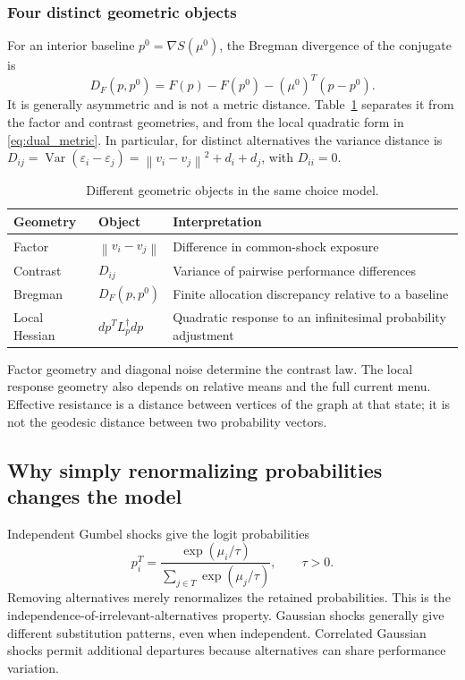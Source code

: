 \documentclass[11pt]{amsart}
\newcommand{\norm}[1]{\left\lVert#1\right\rVert}
\theoremstyle{definition}
\begin{document}
\subsubsection{Four distinct geometric objects}
For an interior baseline $p^0=\nabla S(\mu^0)$, the Bregman divergence of
the conjugate is
\begin{equation}\label{eq:bregman}
 D_F(p,p^0)=F(p)-F(p^0)-(\mu^0)^T(p-p^0).
\end{equation}
It is generally asymmetric and is not a metric distance. Table~\ref{tab:geometries}
separates it from the factor and contrast geometries, and from the local
quadratic form in \eqref{eq:dual_metric}. In particular, for distinct
alternatives the variance distance is
$D_{ij}=\operatorname{Var}(\varepsilon_i-\varepsilon_j)
=\norm{v_i-v_j}^2+d_i+d_j$, with $D_{ii}=0$.

\begin{table}[ht]
\centering\small
\caption{Different geometric objects in the same choice model.}\label{tab:geometries}
\begin{tabular}{>{\raggedright\arraybackslash}p{}>{\raggedright\arraybackslash}p{}>{\raggedright\arraybackslash}p{}}
\toprule
Geometry & Object & Interpretation \\
\midrule
Factor & $\norm{v_i-v_j}$ & Difference in common-shock exposure \\
Contrast & $D_{ij}$ & Variance of pairwise performance differences \\
Bregman & $D_F(p,p^0)$ & Finite allocation discrepancy relative to a baseline \\
Local Hessian & $dp^TL_p^\dagger dp$ & Quadratic response to an infinitesimal probability adjustment \\
\bottomrule
\end{tabular}
\end{table}
Factor geometry and diagonal noise determine the contrast law. The local
response geometry also depends on relative means and the full current menu.
Effective resistance is a distance between vertices of the graph at that
state; it is not the geodesic distance between two probability vectors.

\subsection{Why simply renormalizing probabilities changes the model}
Independent Gumbel shocks give the logit probabilities
\[
 p_i^T=\frac{\exp(\mu_i/\tau)}{\sum_{j\in T}\exp(\mu_j/\tau)},\qquad \tau>0.
\]
Removing alternatives merely renormalizes the retained probabilities. This is the independence-of-irrelevant-alternatives property. Gaussian shocks generally give different substitution patterns, even when independent. Correlated Gaussian shocks permit additional departures because alternatives can share performance variation.
\end{document}
